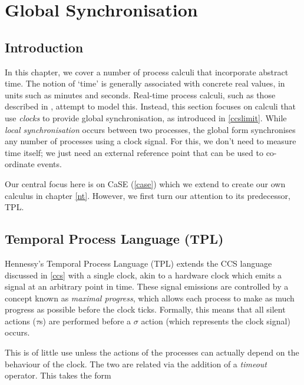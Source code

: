 
\chapter{Global Synchronisation}
\label{globsync}

\section{Introduction}
\label{timing}

In this chapter, we cover a number of process calculi that incorporate
abstract time.  The notion of `time' is generally associated with
concrete real values, in units such as minutes and seconds.  Real-time
process calculi, such as those described in
\cite{tccs,satoh:distrib,aceto:timing,satoh:phd,beaten:timing,lee:realtime,brics:lee},
attempt to model this.  Instead, this section focuses on calculi that
use \emph{clocks} to provide global synchronisation, as introduced in
\ref{ccslimit}.  While \emph{local synchronisation} occurs between two
processes, the global form synchronises any number of processes using
a clock signal.  For this, we don't need to measure time itself; we
just need an external reference point that can be used to co-ordinate
events.

Our central focus here is on CaSE (\ref{case}) which we extend to
create our own calculus in chapter \ref{nt}.  However, we first turn
our attention to its predecessor, TPL.

\section{Temporal Process Language (TPL)}
\label{tpl}

Hennessy's Temporal Process Language (TPL) \cite{hennessy:tpl} extends
the CCS language discussed in \ref{ccs} with a single clock, akin to a
hardware clock which emits a signal at an arbitrary point in time.
These signal emissions are controlled by a concept known as
\emph{maximal progress}, which allows each process to make as much
progress as possible before the clock ticks.  Formally, this means
that all silent actions ($\tau$s) are performed before a $\sigma$
action (which represents the clock signal) occurs.

This is of little use unless the actions of the processes can actually
depend on the behaviour of the clock.  The two are related via the
addition of a \emph{timeout} operator.  This takes the form

